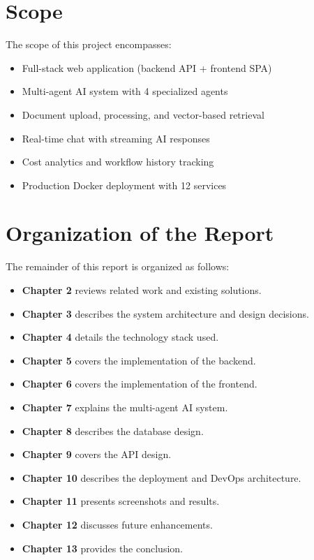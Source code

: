 \documentclass[12pt, a4paper]{report}
\begin{document}
\section{Scope}

The scope of this project encompasses:

\begin{itemize}
    \item Full-stack web application (backend API + frontend SPA)
    \item Multi-agent AI system with 4 specialized agents
    \item Document upload, processing, and vector-based retrieval
    \item Real-time chat with streaming AI responses
    \item Cost analytics and workflow history tracking
    \item Production Docker deployment with 12 services
\end{itemize}

\section{Organization of the Report}

The remainder of this report is organized as follows:

\begin{itemize}
    \item \textbf{Chapter 2} reviews related work and existing solutions.
    \item \textbf{Chapter 3} describes the system architecture and design decisions.
    \item \textbf{Chapter 4} details the technology stack used.
    \item \textbf{Chapter 5} covers the implementation of the backend.
    \item \textbf{Chapter 6} covers the implementation of the frontend.
    \item \textbf{Chapter 7} explains the multi-agent AI system.
    \item \textbf{Chapter 8} describes the database design.
    \item \textbf{Chapter 9} covers the API design.
    \item \textbf{Chapter 10} describes the deployment and DevOps architecture.
    \item \textbf{Chapter 11} presents screenshots and results.
    \item \textbf{Chapter 12} discusses future enhancements.
    \item \textbf{Chapter 13} provides the conclusion.
\end{itemize}
\end{document}
